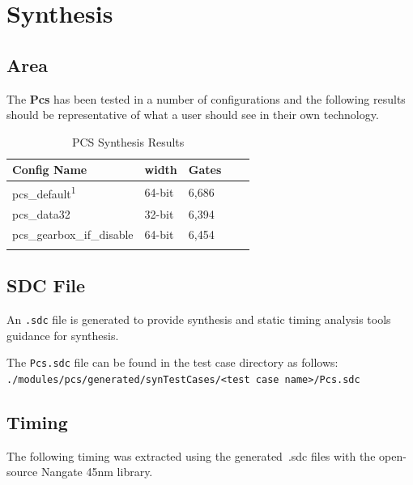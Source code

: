 \section{Synthesis}

\subsection{Area}

The \textbf{Pcs} has been tested in a number of configurations and the
following results should be representative of what a user should see in their
own technology.

\renewcommand*{\arraystretch}{1.4}
\begin{longtable}[H]{
    | p{}
    | p{}
    | p{}
    | p{}
    | p{} |
  }
  \hline
  \textbf{Config Name} &
  \textbf{width}       &
  \textbf{Gates}         \\ \hline \hline

  pcs\_default\textsuperscript{1}  & 
  64-bit              & 
  6,686               \\ \hline

  pcs\_data32         & 
  32-bit              & 
  6,394               \\ \hline

  pcs\_gearbox\_if\_disable& 
  64-bit              & 
  6,454               \\ \hline

  \caption{PCS Synthesis Results}\label{table:area}
\end{longtable}

\subsection{SDC File}
An \texttt{.sdc} file is generated to provide synthesis and static timing
analysis tools guidance for synthesis.

The \texttt{Pcs.sdc} file can be found in the test case directory as follows: \\
\texttt{./modules/pcs/generated/synTestCases/<test case name>/Pcs.sdc}

\subsection{Timing}

The following timing was extracted using the generated~.sdc files with the
open-source Nangate 45nm library.

